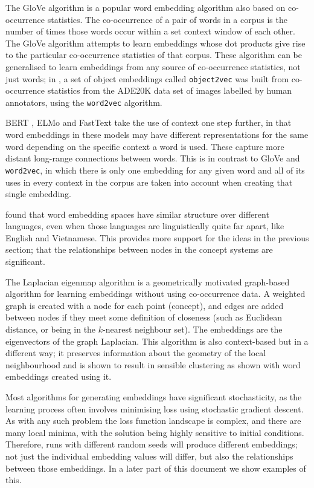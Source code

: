 The GloVe \cite{pennington2014glove} algorithm is a popular word embedding algorithm also based on co-occurrence statistics. The co-occurrence of a pair of words in a corpus is the number of times those words occur within a set context window of each other. The GloVe algorithm attempts to learn embeddings whose dot products give rise to the particular co-occurrence statistics of that corpus. These algorithm can be generalised to learn embeddings from any source of co-occurrence statistics, not just words; in \cite{CoocurrenceVisionLanguage2021}, a set of object embeddings called \texttt{object2vec} was built from co-occurrence statistics from the ADE20K data set \cite{ADE20K} of images labelled by human annotators, using the \texttt{word2vec} algorithm. 

BERT \cite{BERT}, ELMo \cite{ELMo} and FastText \cite{FastText} take the use of context one step further, in that word embeddings in these models may have different representations for the same word depending on the specific context a word is used. These capture more distant long-range connections between words. This is in contrast to GloVe and \texttt{word2vec}, in which there is only one embedding for any given word and all of its uses in every context in the corpus are taken into account when creating that single embedding. 

\cite{MikolovMachineTranslation} found that word embedding spaces have similar structure over different languages, even when those languages are linguistically quite far apart, like English and Vietnamese. This provides more support for the ideas in the previous section; that the relationships between nodes in the concept systems are significant. 

The Laplacian eigenmap algorithm \cite{LaplacianEigenmaps} is a geometrically motivated graph-based algorithm for learning embeddings without using co-occurrence data. A weighted graph is created with a node for each point (concept), and edges are added between nodes if they meet some definition of closeness (such as Euclidean distance, or being in the $k$-nearest neighbour set). The embeddings are the eigenvectors of the graph Laplacian. This algorithm is also context-based but in a different way; it preserves information about the geometry of the local neighbourhood and is shown to result in sensible clustering as shown with word embeddings created using it. 

Most algorithms for generating embeddings have significant stochasticity, as the learning process often involves minimising loss using stochastic gradient descent. As with any such problem the loss function landscape is complex, and there are many local minima, with the solution being highly sensitive to initial conditions. Therefore, runs with different random seeds will produce different embeddings; not just the individual embedding values will differ, but also the relationships between those embeddings. In a later part of this document we show examples of this. 

